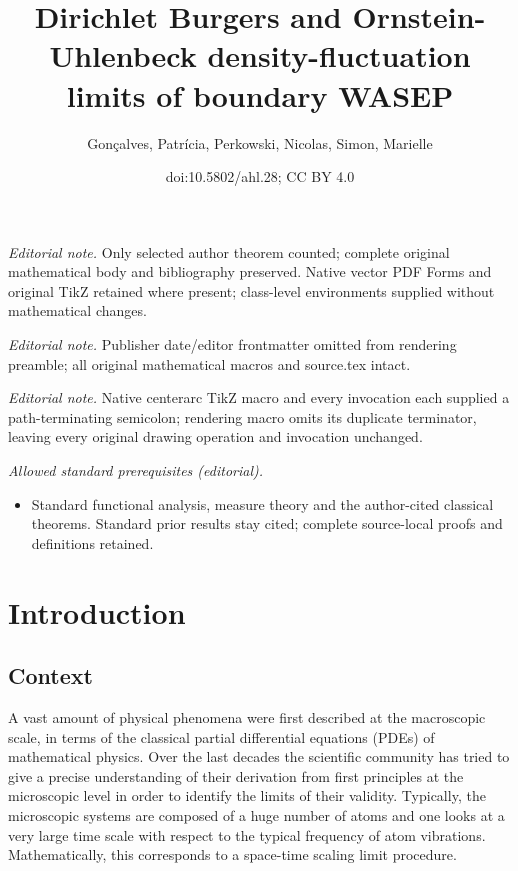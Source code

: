 \documentclass[10pt]{amsart}
\title{Dirichlet Burgers and Ornstein-Uhlenbeck density-fluctuation limits of boundary WASEP}
\author{Gonçalves, Patrícia, Perkowski, Nicolas, Simon, Marielle}
\date{doi:10.5802/ahl.28; CC BY 4.0}
\theoremstyle{definition}\newtheorem{defi}[theo]{Definition}\newtheorem{rema}[theo]{Remark}\newtheorem{exam}[theo]{Example}\newtheorem{exem}[theo]{Example}\newtheorem{nota}[theo]{Notation}
\begin{document}
\maketitle
\noindent\textit{Editorial note.} Only selected author theorem counted; complete original mathematical body and bibliography preserved. Native vector PDF Forms and original TikZ retained where present; class-level environments supplied without mathematical changes.\par\medskip
\noindent\textit{Editorial note.} Publisher date/editor frontmatter omitted from rendering preamble; all original mathematical macros and source.tex intact.\par\medskip
\noindent\textit{Editorial note.} Native centerarc TikZ macro and every invocation each supplied a path-terminating semicolon; rendering macro omits its duplicate terminator, leaving every original drawing operation and invocation unchanged.\par\medskip
\noindent\textit{Allowed standard prerequisites (editorial).}\begin{itemize}
\item Standard functional analysis, measure theory and the author-cited classical theorems. Standard prior results stay cited; complete source-local proofs and definitions retained.
\end{itemize}\medskip

\section{Introduction}\label{s1}

\subsection{Context} A vast amount of physical phenomena were first described at the macroscopic scale, in terms of the classical partial differential equations (PDEs) of mathematical physics. Over the last decades the scientific community has tried to give a precise understanding of their derivation from first principles at the microscopic level in order to identify the limits of their validity. Typically, the microscopic systems are composed of a huge number of atoms and one looks at a very large time scale with respect to the typical frequency of atom vibrations. Mathematically, this corresponds to a space-time scaling limit procedure.
\end{document}
